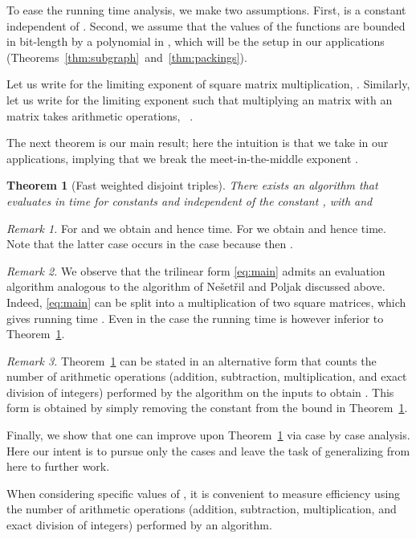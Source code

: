 \documentclass{amsart}
\newtheorem{Thm}{Theorem}
\begin{document}
To ease the running time analysis, we make two assumptions. 
First,  is a constant independent of . 
Second, we assume that the values of the functions  are 
bounded in bit-length by a polynomial in , which will be the setup 
in our applications (Theorems~\ref{thm:subgraph}~and~\ref{thm:packings}).

Let us write  for the limiting exponent of square matrix 
multiplication,  \cite{LG14,VW12}.
Similarly, let us write  for the limiting 
exponent such that multiplying an  matrix with 
an  matrix takes  arithmetic operations, 
~\cite{LG12}. 

The next theorem is our main result; here the intuition is that we
take  in our applications, implying that we break the 
meet-in-the-middle exponent .

\begin{Thm}[Fast weighted disjoint triples]
\label{thm:main}
There exists an algorithm that evaluates  
in time 
for constants  and  independent of the constant ,
with  and 

\end{Thm}

\noindent
{\em Remark 1.} 
For  and  we obtain  and hence
 time.
For  we obtain  and hence
 time. Note that the latter case
occurs in the case  because then .

\medskip
\noindent
{\em Remark 2.} 
We observe that the trilinear form \eqref{eq:main} admits an evaluation 
algorithm analogous to the algorithm of 
Ne\v{s}et\v{r}il and Poljak \cite{NP85} discussed above. 
Indeed, \eqref{eq:main} can be split into a multiplication of two
 square matrices, which gives running time
. Even in the case  the running
time  is however inferior to Theorem~\ref{thm:main}.

\medskip
\noindent
{\em Remark 3.} 
Theorem~\ref{thm:main} can be stated in an alternative form that
counts the number of arithmetic operations (addition, subtraction, 
multiplication, and exact division of integers) performed by the 
algorithm on the inputs  to obtain . 
This form is obtained by simply removing the constant  from 
the bound in Theorem~\ref{thm:main}. 

Finally, we show that one can improve upon Theorem~\ref{thm:main}
via case by case analysis. Here our intent is to pursue only the 
cases  and leave the task of generalizing from here to
further work. 

When considering specific values of , it is convenient to 
measure efficiency using the number of arithmetic operations 
(addition, subtraction, multiplication, and exact division of 
integers) performed by an algorithm. 
\end{document}
